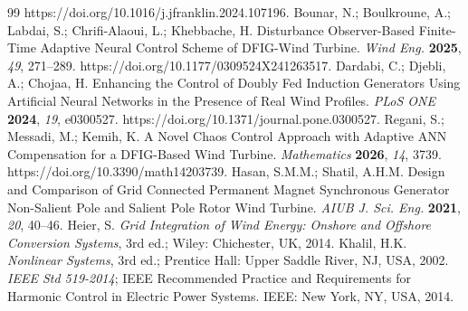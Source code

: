 \documentclass[11pt,a4paper]{article}
\begin{document}
\begin{thebibliography}{99}
https://doi.org/10.1016/j.jfranklin.2024.107196.
 Bounar, N.; Boulkroune, A.; Labdai, S.; Chrifi-Alaoui, L.; Khebbache, H.
Disturbance Observer-Based Finite-Time Adaptive Neural Control Scheme of DFIG-Wind Turbine. \emph{Wind
Eng.} \textbf{2025}, \emph{49}, 271--289. https://doi.org/10.1177/0309524X241263517.
 Dardabi, C.; Djebli, A.; Chojaa, H. Enhancing the Control of Doubly Fed Induction
Generators Using Artificial Neural Networks in the Presence of Real Wind Profiles. \emph{PLoS ONE}
\textbf{2024}, \emph{19}, e0300527. https://doi.org/10.1371/journal.pone.0300527.
 Regani, S.; Messadi, M.; Kemih, K. A Novel Chaos Control Approach with Adaptive ANN
Compensation for a DFIG-Based Wind Turbine. \emph{Mathematics} \textbf{2026}, \emph{14}, 3739.
https://doi.org/10.3390/math14203739.
 Hasan, S.M.M.; Shatil, A.H.M. Design and Comparison of Grid Connected Permanent
Magnet Synchronous Generator Non-Salient Pole and Salient Pole Rotor Wind Turbine. \emph{AIUB J. Sci.
Eng.} \textbf{2021}, \emph{20}, 40--46.
 Heier, S. \emph{Grid Integration of Wind Energy: Onshore and Offshore Conversion
Systems}, 3rd ed.; Wiley: Chichester, UK, 2014.
 Khalil, H.K. \emph{Nonlinear Systems}, 3rd ed.; Prentice Hall: Upper Saddle River,
NJ, USA, 2002.
 \emph{IEEE Std 519-2014}; IEEE Recommended Practice and Requirements for Harmonic
Control in Electric Power Systems. IEEE: New York, NY, USA, 2014.
\end{thebibliography}
\end{document}

